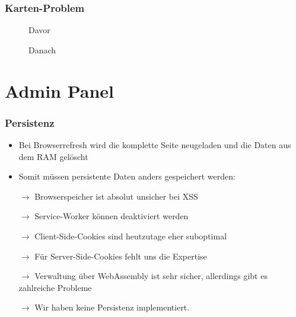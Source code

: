 \begin{frame}\frametitle{Karten-Problem}
    \begin{minipage}{.49\textwidth}
        \centering
        \begin{figure}
            \caption{Davor}
        \end{figure}
    \end{minipage}
    \begin{minipage}{.49\textwidth}
        \centering
        \begin{figure}
            \caption{Danach}
        \end{figure}
    \end{minipage}
\end{frame}

\section{Admin Panel}

\begin{frame}\frametitle{Persistenz}
    \begin{itemize}
        \item Bei Browserrefresh wird die komplette Seite neugeladen und die Daten aus dem RAM gelöscht
        \item Somit müssen persistente Daten anders gespeichert werden:
        \item[$\rightarrow$] Browserspeicher ist absolut unsicher bei XSS
        \item[$\rightarrow$] Service-Worker können deaktiviert werden
        \item[$\rightarrow$] Client-Side-Cookies sind heutzutage eher suboptimal  
        \item[$\rightarrow$] Für Server-Side-Cookies fehlt uns die Expertise
        \item[$\rightarrow$] Verwaltung über WebAssembly ist sehr sicher, allerdings gibt es zahlreiche Probleme
        \item[$\rightarrow$] Wir haben keine Persistenz implementiert.   
    \end{itemize}
\end{frame}